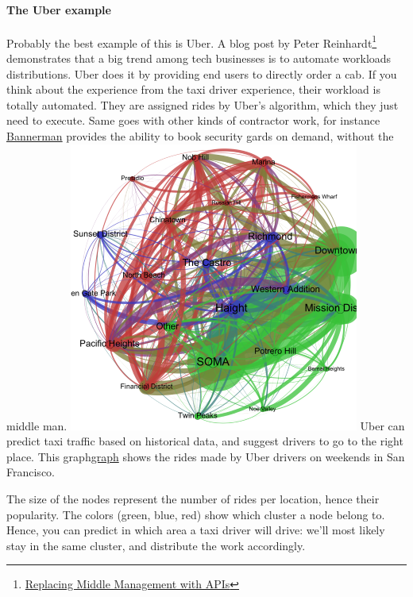 \documentclass[12pt]{article}
\begin{document}
\paragraph{The Uber example}

Probably the best example of this is Uber. A blog post by Peter Reinhardt\footnote{\href{http://rein.pk/replacing-middle-management-with-apis/}{Replacing Middle Management with APIs}} demonstrates that a big trend among tech businesses is to automate workloads distributions. Uber does it by providing end users to directly order a cab. If you think about the experience from the taxi driver experience, their workload is totally automated. They are assigned rides by Uber's algorithm, which they just need to execute. Same goes with other kinds of contractor work, for instance \href{https://www.getbannerman.com/}{Bannerman} provides the ability to book security gards on demand, without the middle man.
\smallskip
\includegraphics[width=\textwidth]{uber-graph}
Uber can predict taxi traffic based on historical data, and suggest drivers to go to the right place. This graph\href{http://blogs.mathworks.com/loren/2014/09/06/analyzing-uber-ride-sharing-gps-data/}{graph} shows the rides made by Uber drivers on weekends in San Francisco.

The size of the nodes represent the number of rides per location, hence their popularity.
The colors (green, blue, red) show which cluster a node belong to. Hence, you can predict in which area a taxi driver will drive: we'll most likely stay in the same cluster, and distribute the work accordingly.
\smallskip
\end{document}
